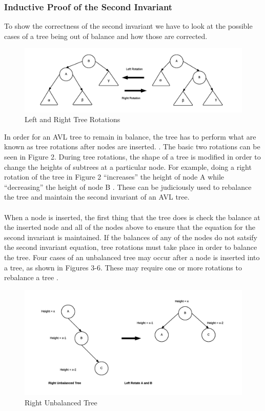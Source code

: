 \documentclass[12pt]{article}
\begin{document}
\subsubsection*{Inductive Proof of the Second Invariant}
To show the correctness of the second invariant we have to look at the possible
cases of a tree being out of balance and how those are corrected.
\begin{figure}[h]
\caption{Left and Right Tree Rotations}
\includegraphics[width=15cm]{tree_rotations.png}
\centering
\end{figure}
\noindent
In order for an AVL tree to remain in balance, the tree has to
perform what are known as tree rotations after nodes are inserted.
\cite{wiki:avl}.
The basic two rotations can be seen in Figure 2.  During tree rotations, the
shape of a tree is modified in order to change the heights of subtrees
at a particular node.  For example, doing a right rotation of the tree in
Figure 2 ``increases'' the height of node A while ``decreasing'' the height of
node B \cite{wiki:tree-rotations}.  These can be judiciously used to rebalance
the tree and maintain the second invariant of an AVL tree.\\
\\
When a node is inserted, the first thing that the tree does is check
the balance at the inserted node and all of the nodes above to
ensure that the equation for the second invariant is maintained.  If the
balances of any of the nodes do not satsify the second invariant equation, tree
rotations must take place in order to balance the tree.  
Four cases of an unbalanced tree may occur after a node is inserted into a tree,
as shown in Figures 3-6.  These may require one or more
rotations to rebalance a tree \cite{tutorialspoint:avl}.
\begin{figure}[h]
\caption{Right Unbalanced Tree}
\includegraphics[width=15cm]{right_unbalanced_tree.png}
\centering
\end{figure}
\end{document}
